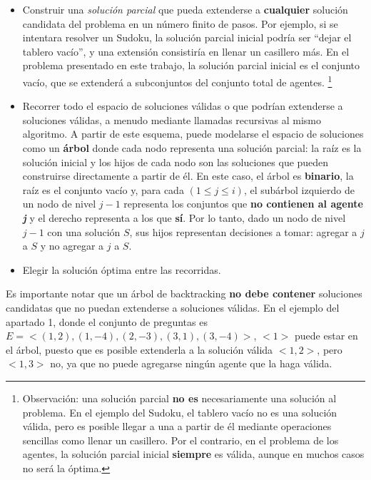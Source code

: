 \documentclass[10pt, a4paper]{article}
\begin{document}
		\begin{itemize}
		\item Construir una \textit{soluci\'on parcial} que pueda extenderse a \textbf{cualquier} soluci\'on candidata del problema en un n\'umero finito de pasos. Por ejemplo, si se intentara resolver un Sudoku, la soluci\'on parcial inicial podr\'ia ser ``dejar el tablero vac\'io'', y una extensi\'on consistir\'ia en llenar un casillero m\'as. En el problema presentado en este trabajo, la soluci\'on parcial inicial es el conjunto vac\'io, que se extender\'a a subconjuntos del conjunto total de agentes. \footnote{Observaci\'on: una soluci\'on parcial \textbf{no es} necesariamente una soluci\'on al problema. En el ejemplo del Sudoku, el tablero vac\'io no es una soluci\'on v\'alida, pero es posible llegar a una a partir de \'el mediante operaciones sencillas como llenar un casillero. Por el contrario, en el problema de los agentes, la soluci\'on parcial inicial \textbf{siempre} es v\'alida, aunque en muchos casos no ser\'a la \'optima.}
		\item Recorrer todo el espacio de soluciones v\'alidas o que podr\'ian extenderse a soluciones v\'alidas, a menudo mediante llamadas recursivas al mismo algoritmo. A partir de este esquema, puede modelarse el espacio de soluciones como un \textbf{\'arbol} donde cada nodo representa una soluci\'on parcial: la ra\'iz es la soluci\'on inicial y los hijos de cada nodo son las soluciones que pueden construirse directamente a partir de \'el. En este caso, el \'arbol es \textbf{binario}, la ra\'iz es el conjunto vac\'io y, para cada $(1 \leq j \leq i)$, el sub\'arbol izquierdo de un nodo de nivel $j-1$ representa los conjuntos que \textbf{no contienen al agente \textit{j}} y el derecho representa a los que \textbf{s\'i}. Por lo tanto, dado un nodo de nivel $j-1$ con una soluci\'on $S$, sus hijos representan decisiones a tomar: agregar a $j$ a $S$ y no agregar a $j$ a $S$.
		\item Elegir la soluci\'on \'optima entre las recorridas.
		\end{itemize}
		
		Es importante notar que un \'arbol de backtracking \textbf{no debe contener} soluciones candidatas que no puedan extenderse a soluciones v\'alidas. En el ejemplo del apartado 1, donde el conjunto de preguntas es $E = <(1,2), (1,-4), (2,-3), (3,1), (3,-4)>$, $<1>$ puede estar en el \'arbol, puesto que es posible extenderla a la soluci\'on v\'alida $<1, 2>$, pero $<1, 3>$ no, ya que no puede agregarse ning\'un agente que la haga v\'alida.
		
\end{document}

